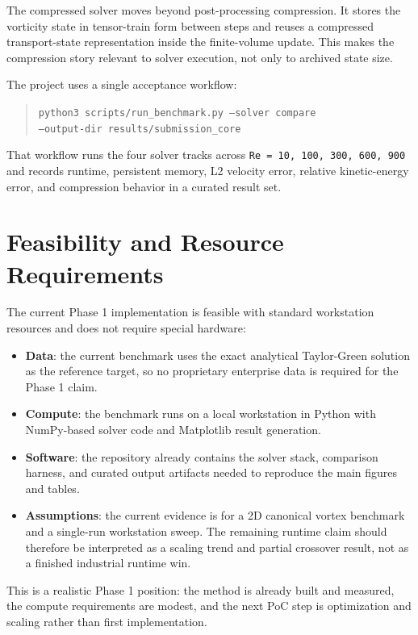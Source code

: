 \documentclass[11pt,a4paper]{article}
\begin{document}
The compressed solver moves beyond post-processing compression. It stores the vorticity state in tensor-train form between steps and reuses a compressed transport-state representation inside the finite-volume update. This makes the compression story relevant to solver execution, not only to archived state size.

The project uses a single acceptance workflow:

\begin{quote}
\texttt{python3 scripts/run\_benchmark.py --solver compare}\\
\texttt{--output-dir results/submission\_core}
\end{quote}

That workflow runs the four solver tracks across \texttt{Re = 10, 100, 300, 600, 900} and records runtime, persistent memory, L2 velocity error, relative kinetic-energy error, and compression behavior in a curated result set.

\section{Feasibility and Resource Requirements}

The current Phase 1 implementation is feasible with standard workstation resources and does not require special hardware:

\begin{itemize}
\item \textbf{Data}: the current benchmark uses the exact analytical Taylor-Green solution as the reference target, so no proprietary enterprise data is required for the Phase 1 claim.
\item \textbf{Compute}: the benchmark runs on a local workstation in Python with NumPy-based solver code and Matplotlib result generation.
\item \textbf{Software}: the repository already contains the solver stack, comparison harness, and curated output artifacts needed to reproduce the main figures and tables.
\item \textbf{Assumptions}: the current evidence is for a 2D canonical vortex benchmark and a single-run workstation sweep. The remaining runtime claim should therefore be interpreted as a scaling trend and partial crossover result, not as a finished industrial runtime win.
\end{itemize}

This is a realistic Phase 1 position: the method is already built and measured, the compute requirements are modest, and the next PoC step is optimization and scaling rather than first implementation.
\end{document}
